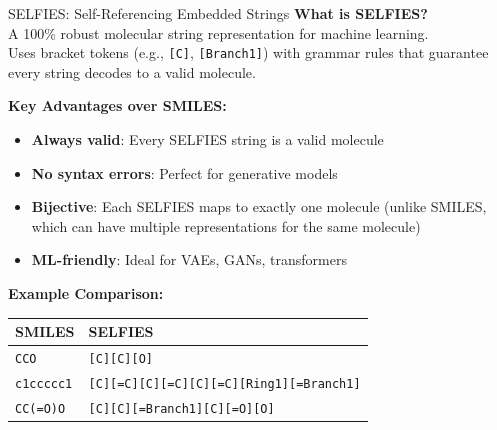 \documentclass{beamer}
\begin{document}
\begin{frame}{SELFIES: Self-Referencing Embedded Strings}
    \small
    \textbf{What is SELFIES?}\\
    A 100\% robust molecular string representation for machine learning.\\
    Uses bracket tokens (e.g., \texttt{[C]}, \texttt{[Branch1]}) with grammar rules that guarantee every string decodes to a valid molecule.
    \vspace{0.5em}
    
    \textbf{Key Advantages over SMILES:}
    \begin{itemize}
        \item \textbf{Always valid}: Every SELFIES string is a valid molecule
        \item \textbf{No syntax errors}: Perfect for generative models
        \item \textbf{Bijective}: Each SELFIES maps to exactly one molecule (unlike SMILES, which can have multiple representations for the same molecule)
        \item \textbf{ML-friendly}: Ideal for VAEs, GANs, transformers
    \end{itemize}
    \vspace{0.3em}
    
    \textbf{Example Comparison:}
    \begin{tabular}{ll}
        \textbf{SMILES} & \textbf{SELFIES} \\
        \hline
        \texttt{CCO} & \texttt{[C][C][O]} \\
        \texttt{c1ccccc1} & \texttt{[C][=C][C][=C][C][=C][Ring1][=Branch1]} \\
        \texttt{CC(=O)O} & \texttt{[C][C][=Branch1][C][=O][O]} \\
    \end{tabular}
\end{frame}
\end{document}
